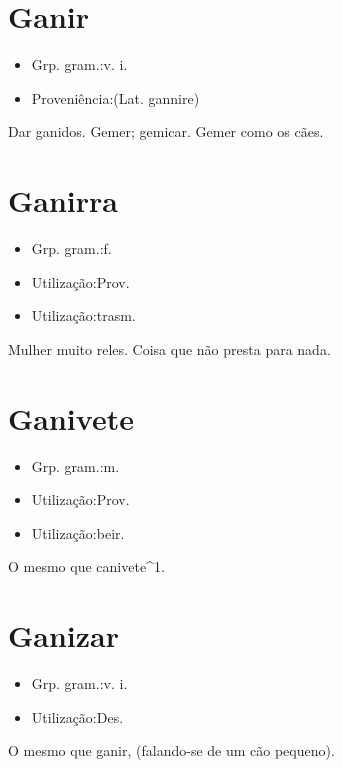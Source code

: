 \section{Ganir}
\begin{itemize}
\item {Grp. gram.:v. i.}
\end{itemize}
\begin{itemize}
\item {Proveniência:(Lat. \textunderscore gannire\textunderscore )}
\end{itemize}
Dar ganidos.
Gemer; gemicar.
Gemer como os cães.
\section{Ganirra}
\begin{itemize}
\item {Grp. gram.:f.}
\end{itemize}
\begin{itemize}
\item {Utilização:Prov.}
\end{itemize}
\begin{itemize}
\item {Utilização:trasm.}
\end{itemize}
Mulher muito reles.
Coisa que não presta para nada.
\section{Ganivete}
\begin{itemize}
\item {Grp. gram.:m.}
\end{itemize}
\begin{itemize}
\item {Utilização:Prov.}
\end{itemize}
\begin{itemize}
\item {Utilização:beir.}
\end{itemize}
O mesmo que \textunderscore canivete\textunderscore ^1.
\section{Ganizar}
\begin{itemize}
\item {Grp. gram.:v. i.}
\end{itemize}
\begin{itemize}
\item {Utilização:Des.}
\end{itemize}
O mesmo que \textunderscore ganir\textunderscore , (falando-se de um cão pequeno).
